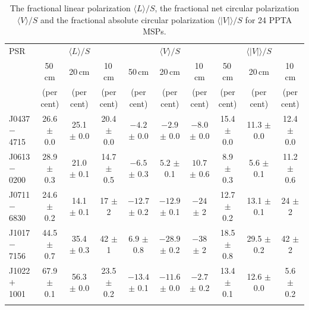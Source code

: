 \documentclass[useAMS,usenatbib]{mn2e}
\begin{document}
%
\begin{table}
\begin{center}
\caption{The fractional linear polarization $\langle L \rangle/S$, 
the fractional net circular polarization $\langle V \rangle/S$ and the fractional absolute 
circular polarization $\langle|V|\rangle/S$ for 24 PPTA MSPs.}
\label{tablePol}
\begin{tabular}{lccccccccc}
\hline
PSR              &                  &    $\langle L \rangle/S$    &                  &               & $\langle V \rangle/S$       &                  &      &      $\langle|V|\rangle/S$       &                      \\
								 &    50\,cm      &   20\,cm       &    10\,cm &    50\,cm      &   20\,cm       &    10\,cm &    50\,cm      &   20\,cm       &    10\,cm              \\
								 &     (per cent)   &         (per cent)          &     (per cent)   &    (per cent)   &         (per cent)          &     (per cent)   &   (per cent)   &         (per cent)          &     (per cent)  \\
\hline
J0437$-$4715& 26.6 $\pm$ 0.0& 25.1 $\pm $ 0.0& 20.4 $\pm$ 0.0&$ -4.2$ $\pm$ 0.0 &$ -2.9$ $\pm$ 0.0 &$ -8.0$ $\pm$ 0.0 & 15.4 $\pm$ 0.0 & 11.3 $\pm$ 0.0 & 12.4 $\pm$ 0.0 \\
J0613$-$0200& 28.9 $\pm$ 0.3& 21.0 $\pm $ 0.1& 14.7 $\pm$ 0.5&$ -6.5$ $\pm$ 0.3 &$ 5.2 $ $\pm$ 0.1 &$ 10.7$ $\pm$ 0.6 &  8.9 $\pm$ 0.3 &  5.6 $\pm$ 0.1 & 11.2 $\pm$ 0.6 \\
J0711$-$6830& 24.6 $\pm$ 0.2& 14.1 $\pm $ 0.1& 17   $\pm$ 2  &$-12.7$ $\pm$ 0.2 &$-12.9$ $\pm$ 0.1 &$ -24 $ $\pm$ 2   & 12.7 $\pm$ 0.2 & 13.1 $\pm$ 0.1 & 24   $\pm$ 2 \\
J1017$-$7156& 44.5 $\pm$ 0.7& 35.4 $\pm $ 0.3& 42   $\pm$ 1  &$  6.9$ $\pm$ 0.8 &$-28.9$ $\pm$ 0.2 &$ -38 $ $\pm$ 2   & 18.5 $\pm$ 0.8 & 29.5 $\pm$ 0.2 & 42   $\pm$ 2 \\
J1022$+$1001& 67.9 $\pm$ 0.1& 56.3 $\pm $ 0.0& 23.5 $\pm$ 0.2&$-13.4$ $\pm$ 0.1 &$-11.6$ $\pm$ 0.0 &$ -2.7$ $\pm$ 0.2 & 13.4 $\pm$ 0.1 & 12.6 $\pm$ 0.0 & 5.6  $\pm$ 0.2 \\
            &               &                &               &                &                &                &                &                &                \\

\end{tabular}
\end{center}
\end{table}
\end{document}
